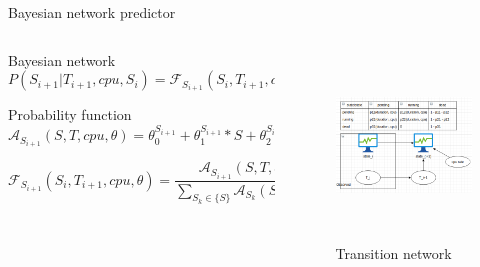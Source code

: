 \documentclass[10pt,xcolor={dvipsnames}, aspectratio=169]{beamer}
\begin{document}
\begin{frame}
{Bayesian network predictor}
	\begin{columns}[T]
	
		\begin{column}{0.6\textwidth}
			\begin{block}
			{Bayesian network}
				\begin{equation*}
					P(S_{i+1}|T_{i+1}, cpu, S_{i}) = \mathcal{F}_{S_{i+1}}(S_{i}, T_{i+1}, cpu, \theta)
				\end{equation*}
			\end{block}
			
			\begin{block}
			{Probability function}
				\begin{equation*}
					\mathcal{A}_{S_{i+1}}(S, T, cpu, \theta) = \theta_{0}^{S_{i+1}} + \theta_{1}^{S_{i+1}}*S + \theta_{2}^{S_{i+1}}*T + \theta_{3}^{S_{i+1}}*cpu
				\end{equation*}
				
				\begin{equation*}
					\mathcal{F}_{S_{i+1}}(S_{i}, T_{i+1}, cpu, \theta) = \frac{\mathcal{A}_{S_{i+1}}(S, T, cpu, \theta)}{\sum_{S_{k} \in \{S\}}{\mathcal{A}_{S_{k}}(S, T, cpu, \theta)}}
				\end{equation*}
			\end{block}
		\end{column}

		\hfill		
		
		\begin{column}{0.4\textwidth}
			\begin{figure}
				\centering
				\includegraphics[height=5cm, width=6cm]{images/bayesian_predictor.png}
				\caption{Transition network}
			\end{figure}		
		\end{column}
	\end{columns}
\end{frame}
\end{document}

